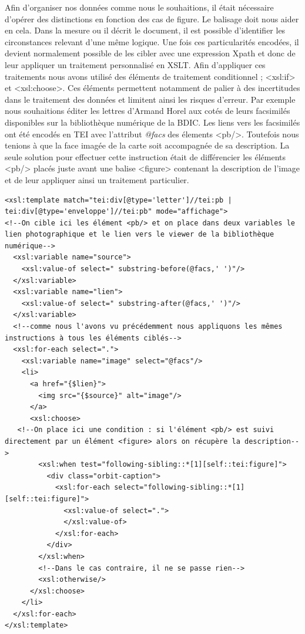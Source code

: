 \documentclass[12pt,a4paper]{book} %
\begin{document}
Afin d'organiser nos données comme nous le souhaitions, il était nécessaire d'opérer des distinctions en fonction des cas de figure. Le balisage doit nous aider en cela. Dans la mesure ou il décrit le document, il est possible d'identifier les circonstances relevant d'une même logique. Une fois ces particularités encodées, il devient normalement possible de les cibler avec une expression Xpath et donc de leur appliquer un traitement personnalisé en XSLT. Afin d'appliquer ces traitements nous avons utilisé des éléments de traitement conditionnel ; <xsl:if> et <xsl:choose>. Ces éléments permettent notamment de palier à des incertitudes dans le traitement des données et limitent ainsi les risques d'erreur. Par exemple nous souhaitions éditer les lettres d'Armand Horel aux cotés de leurs facsimilés disponibles sur la bibliothèque numérique de la BDIC. Les liens vers les facsimilés ont été encodés en TEI avec l'attribut \textit{@facs} des élements <pb/>. Toutefois nous tenions à que la face imagée de la carte soit accompagnée de sa description. La seule solution pour effectuer cette instruction était de différencier les éléments <pb/> placés juste avant une balise <figure> contenant la description de l'image et de leur appliquer ainsi un traitement particulier.

\begin{lstlisting}
<xsl:template match="tei:div[@type='letter']//tei:pb | tei:div[@type='enveloppe']//tei:pb" mode="affichage">
<!--On cible ici les élément <pb/> et on place dans deux variables le lien photographique et le lien vers le viewer de la bibliothèque numérique-->
  <xsl:variable name="source">
    <xsl:value-of select=" substring-before(@facs,' ')"/>
  </xsl:variable>
  <xsl:variable name="lien">
    <xsl:value-of select=" substring-after(@facs,' ')"/>
  </xsl:variable>
  <!--comme nous l'avons vu précédemment nous appliquons les mêmes instructions à tous les éléments ciblés-->
  <xsl:for-each select=".">
    <xsl:variable name="image" select="@facs"/>
    <li>
      <a href="{$lien}">
        <img src="{$source}" alt="image"/>
      </a>
      <xsl:choose>
   <!--On place ici une condition : si l'élément <pb/> est suivi directement par un élément <figure> alors on récupère la description-->
        <xsl:when test="following-sibling::*[1][self::tei:figure]">
          <div class="orbit-caption">
            <xsl:for-each select="following-sibling::*[1][self::tei:figure]">
              <xsl:value-of select=".">
              </xsl:value-of>
            </xsl:for-each>
          </div>                                    
        </xsl:when>
        <!--Dans le cas contraire, il ne se passe rien-->
        <xsl:otherwise/>                                                
      </xsl:choose>                                                                                        
    </li>                                
  </xsl:for-each>  
</xsl:template>
\end{lstlisting}
\end{document}
